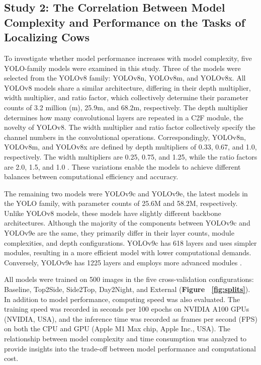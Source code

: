 \subsection*{Study 2: The Correlation Between Model Complexity and Performance on the Tasks of Localizing Cows}

To investigate whether model performance increases with model complexity, five YOLO-family models were examined in this study. Three of the models were selected from the YOLOv8 family: YOLOv8n, YOLOv8m, and YOLOv8x. All YOLOv8 models share a similar architecture, differing in their depth multiplier, width multiplier, and ratio factor, which collectively determine their parameter counts of 3.2 million (m), 25.9m, and 68.2m, respectively. The depth multiplier determines how many convolutional layers are repeated in a C2F module, the novelty of YOLOv8. The width multiplier and ratio factor collectively specify the channel numbers in the convolutional operations. Correspondingly, YOLOv8n, YOLOv8m, and YOLOv8x are defined by depth multipliers of 0.33, 0.67, and 1.0, respectively. The width multipliers are 0.25, 0.75, and 1.25, while the ratio factors are 2.0, 1.5, and 1.0 \cite{v8yaml}. These variations enable the models to achieve different balances between computational efficiency and accuracy.

The remaining two models were YOLOv9c and YOLOv9e, the latest models in the YOLO family, with parameter counts of 25.6M and 58.2M, respectively. Unlike YOLOv8 models, these models have slightly different backbone architectures. Although the majority of the components between YOLOv9c and YOLOv9e are the same, they primarily differ in their layer counts, module complexities, and depth configurations. YOLOv9c has 618 layers and uses simpler modules, resulting in a more efficient model with lower computational demands. Conversely, YOLOv9e has 1225 layers and employs more advanced modules \cite{v9yaml}. 

All models were trained on 500 images in the five cross-validation configurations: Baseline, Top2Side, Side2Top, Day2Night, and External (\textbf{Figure ~\ref{fig:splits}}). In addition to model performance, computing speed was also evaluated. The training speed was recorded in seconds per 100 epochs on NVIDIA A100 GPUs (NVIDIA, USA), and the inference time was recorded as frames per second (FPS) on both the CPU and GPU (Apple M1 Max chip, Apple Inc., USA). The relationship between model complexity and time consumption was analyzed to provide insights into the trade-off between model performance and computational cost.

